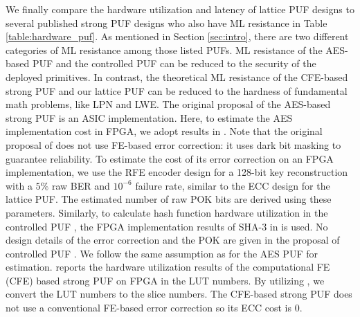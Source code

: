 We finally compare the hardware utilization and latency of lattice PUF designs to several published strong PUF designs \cite{bhargava2014efficient, gassend2008controlled, jin2017fpga} who also have ML resistance in Table \ref{table:hardware_puf}. 
As mentioned in Section \ref{sec:intro}, there are two different categories of ML resistance among those listed PUFs. 
ML resistance of the AES-based PUF and the controlled PUF can be reduced to the security of the deployed primitives. 
In contrast, the theoretical ML resistance of the CFE-based strong PUF and our lattice PUF can be reduced to the hardness of fundamental math problems, like LPN and LWE.
The original proposal of the AES-based strong PUF \cite{bhargava2014efficient} is an ASIC implementation. 
Here, to estimate the AES implementation cost in FPGA, we adopt results in \cite{chu2012low}.
Note that the original proposal of \cite{bhargava2014efficient} does not use FE-based error correction: it uses dark bit masking to guarantee reliability. 
To estimate the cost of its error correction on an FPGA implementation, we use the RFE encoder design for a 128-bit key reconstruction with a $5\%$ raw BER and $10^{-6}$ failure rate, similar to the ECC design for the lattice PUF. The estimated number of raw POK bits are derived using these parameters.
Similarly, to calculate hash function hardware utilization in the controlled PUF \cite{gassend2008controlled}, the FPGA implementation results of SHA-3 in \cite{sha3_finalist} is used. 
No design details of the error correction and the POK are given in the proposal of controlled PUF \cite{gassend2008controlled}. We follow the same assumption as for the AES PUF for estimation.
\cite{jin2017fpga} reports the hardware utilization results of the computational FE (CFE) based strong PUF on FPGA in the LUT numbers.
By utilizing \cite{xilinx:ds190}, we convert the LUT numbers to the slice numbers. 
The CFE-based strong PUF does not use a conventional FE-based error correction so its ECC cost is 0.

